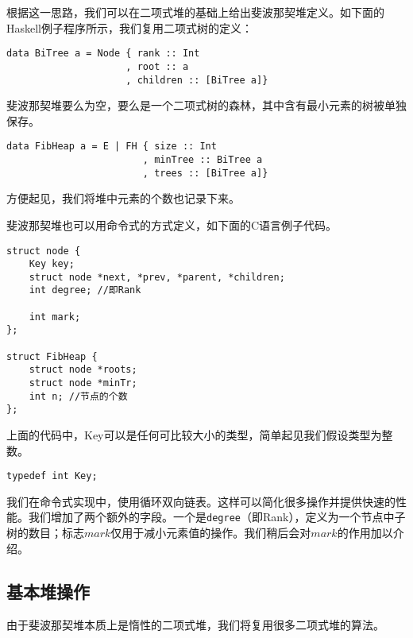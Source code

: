 \documentclass{ctexart}
\begin{document}
根据这一思路，我们可以在二项式堆的基础上给出斐波那契堆定义。如下面的Haskell例子程序所示，我们复用二项式树的定义：

\lstset{language=Haskell}
\begin{lstlisting}[style=Haskell]
data BiTree a = Node { rank :: Int
                     , root :: a
                     , children :: [BiTree a]}
\end{lstlisting}

斐波那契堆要么为空，要么是一个二项式树的森林，其中含有最小元素的树被单独保存。

\begin{lstlisting}[style=Haskell]
data FibHeap a = E | FH { size :: Int
                        , minTree :: BiTree a
                        , trees :: [BiTree a]}
\end{lstlisting}

方便起见，我们将堆中元素的个数也记录下来。

斐波那契堆也可以用命令式的方式定义，如下面的C语言例子代码。

\lstset{language=C}
\begin{lstlisting}
struct node {
    Key key;
    struct node *next, *prev, *parent, *children;
    int degree; //即Rank

    int mark;
};

struct FibHeap {
    struct node *roots;
    struct node *minTr;
    int n; //节点的个数
};
\end{lstlisting}

上面的代码中，Key可以是任何可比较大小的类型，简单起见我们假设类型为整数。

\lstset{language=C}
\begin{lstlisting}
typedef int Key;
\end{lstlisting}

我们在命令式实现中，使用循环双向链表\cite{CLRS}。这样可以简化很多操作并提供快速的性能。我们增加了两个额外的字段。一个是\texttt{degree}（即Rank），定义为一个节点中子树的数目；标志$mark$仅用于减小元素值的操作。我们稍后会对$mark$的作用加以介绍。


\subsection{基本堆操作}

由于斐波那契堆本质上是惰性的二项式堆，我们将复用很多二项式堆的算法。
\end{document}
